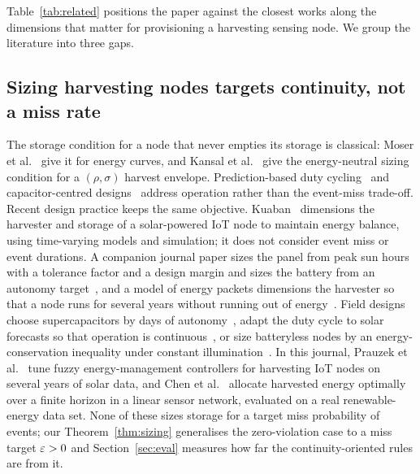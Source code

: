 Table~\ref{tab:related} positions the paper against the closest works along the dimensions that matter for provisioning a harvesting sensing node. We group the literature into three gaps.

\subsection{Sizing harvesting nodes targets continuity, not a miss rate}
The storage condition for a node that never empties its storage is classical: Moser et al.~\cite{moser2007rts} give it for energy curves, and Kansal et al.~\cite{kansal2007} give the energy-neutral sizing condition for a $(\rho,\sigma)$ harvest envelope. Prediction-based duty cycling~\cite{buchli2014sensys,renner2014tosn} and capacitor-centred designs~\cite{jackson2019ipsn} address operation rather than the event-miss trade-off. Recent design practice keeps the same objective. Kuaban~\cite{kuaban2025iwcmc} dimensions the harvester and storage of a solar-powered IoT node to maintain energy balance, using time-varying models and simulation; it does not consider event miss or event durations. A companion journal paper sizes the panel from peak sun hours with a tolerance factor and a design margin and sizes the battery from an autonomy target~\cite{kuaban2025sensors}, and a model of energy packets dimensions the harvester so that a node runs for several years without running out of energy~\cite{kuaban2024fenrg}. Field designs choose supercapacitors by days of autonomy~\cite{gurung2025ijdsn}, adapt the duty cycle to solar forecasts so that operation is continuous~\cite{gerndt2025sensors}, or size batteryless nodes by an energy-conservation inequality under constant illumination~\cite{landivar2025pimrc}. In this journal, Prauzek et al.~\cite{prauzek2025fgcs} tune fuzzy energy-management controllers for harvesting IoT nodes on several years of solar data, and Chen et al.~\cite{chen2025fgcs} allocate harvested energy optimally over a finite horizon in a linear sensor network, evaluated on a real renewable-energy data set. None of these sizes storage for a target miss probability of events; our Theorem~\ref{thm:sizing} generalises the zero-violation case to a miss target $\varepsilon>0$ and Section~\ref{sec:eval} measures how far the continuity-oriented rules are from it.

